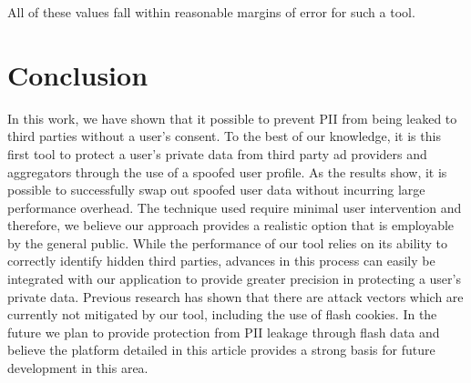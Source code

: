 \documentclass[11pt,twocolumn]{article}
\begin{document}
All of these values fall within reasonable margins of error for such a tool.


\section{Conclusion}
In this work, we have shown that it possible to prevent PII from being leaked to third parties without a user's consent. To the best of our knowledge, it is this first tool to protect a user's private data from third party ad providers and aggregators through the use of a spoofed user profile. As the results show, it is possible to successfully swap out spoofed user data without incurring large performance overhead. The technique used require minimal user intervention and therefore, we believe our approach provides a realistic option that is employable by the general public. While the performance of our tool relies on its ability to correctly identify hidden third parties, advances in this process can easily be integrated with our application to provide greater precision in protecting a user's private data. Previous research has shown that there are attack vectors which are currently not mitigated by our tool, including the use of flash cookies. In the future we plan to provide protection from PII leakage through flash data and believe the platform detailed in this article provides a strong basis for future development in this area.




\end{document}
